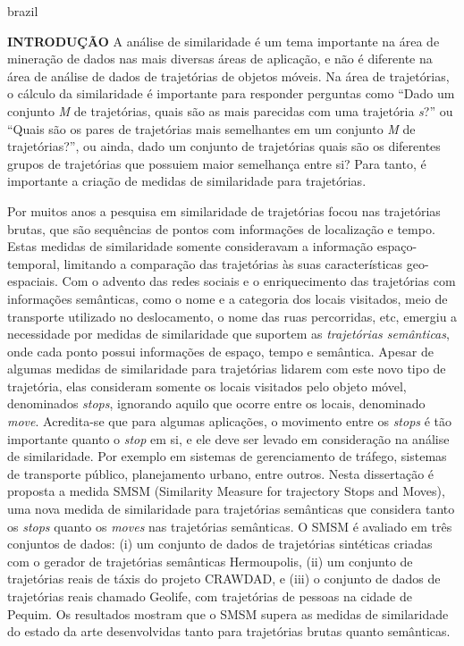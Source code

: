 {
    \begin{otherlanguage*}{brazil}
    \begin{resumo}
        \textbf{INTRODUÇÃO}
        \newline
        \newline
        A análise de similaridade é um tema importante na área de mineração de dados nas mais diversas áreas de aplicação, e não é diferente na área de análise de dados de trajetórias de objetos móveis. Na área de trajetórias, o cálculo da similaridade é importante para responder  perguntas como ``Dado um conjunto \emph{M} de trajetórias, quais são as mais parecidas com uma trajetória \emph{s}?'' ou ``Quais são os pares de trajetórias mais semelhantes em um conjunto \emph{M} de trajetórias?'', ou ainda, dado um conjunto de trajetórias quais são os diferentes grupos de trajetórias que possuiem maior semelhança entre si? Para tanto, é importante a criação de medidas de similaridade para trajetórias.
        
        Por muitos anos a pesquisa em similaridade de trajetórias focou nas trajetórias brutas, que são sequências de pontos com informações de localização e tempo. Estas medidas de similaridade somente consideravam a informação espaço-temporal, limitando a comparação das trajetórias às suas características geo-espaciais. Com o advento das redes sociais e o enriquecimento das trajetórias com informações semânticas, como o nome e a categoria dos locais visitados, meio de transporte utilizado no deslocamento, o nome das ruas percorridas, etc, emergiu a necessidade por medidas de similaridade que suportem as \emph{trajetórias semânticas}, onde cada ponto possui informações de espaço, tempo e semântica. Apesar de algumas medidas de similaridade para trajetórias lidarem com este novo tipo de trajetória, elas consideram somente os locais visitados pelo objeto móvel, denominados \emph{stops}, ignorando aquilo que ocorre entre os locais, denominado \emph{move}.
        Acredita-se que para algumas aplicações, o movimento entre os \emph{stops} é tão importante quanto o \emph{stop} em si, e ele deve ser levado em consideração na análise de similaridade. {Por exemplo em sistemas de gerenciamento de tráfego, sistemas de transporte público, planejamento urbano, entre outros.}
        Nesta dissertação é proposta a medida SMSM (Similarity Measure for trajectory Stops and Moves), uma nova medida de similaridade para trajetórias semânticas que considera tanto os \emph{stops} quanto os \emph{moves} nas trajetórias semânticas.
        O SMSM é avaliado em três conjuntos de dados: (i) um conjunto de dados de trajetórias sintéticas criadas com o gerador de trajetórias semânticas Hermoupolis, (ii) um conjunto de trajetórias reais {de táxis} do projeto CRAWDAD, e (iii) o conjunto de dados de trajetórias reais chamado Geolife, com trajetórias de pessoas na cidade de Pequim. Os resultados mostram que o SMSM supera as medidas de similaridade do estado da arte desenvolvidas tanto para trajetórias brutas quanto semânticas.
        

\end{resumo}
\end{otherlanguage*}}
